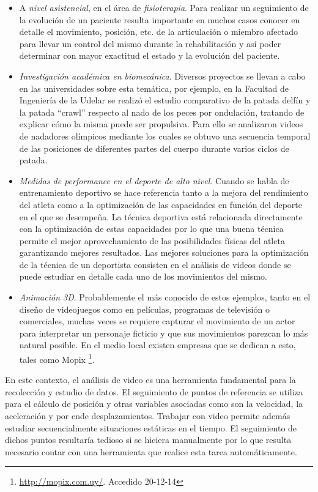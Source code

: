 \begin{itemize}
\item A \emph{nivel asistencial}, en el área de \emph{fisioterapia}. Para realizar un seguimiento de la evolución de un paciente resulta importante en muchos casos conocer en detalle el movimiento, posición, etc. de la articulación o miembro afectado para llevar un control del mismo durante la rehabilitación y así poder determinar con mayor exactitud el estado y la evolución del paciente.
\item \emph{Investigación académica en biomecánica}. Diversos proyectos se llevan a cabo en las universidades sobre esta temática, por ejemplo, en la Facultad de Ingeniería de la Udelar  se realizó el estudio comparativo de la patada delfín y la patada “crawl” respecto al nado de los peces por ondulación, tratando de explicar cómo la misma puede ser propulsiva. Para ello se analizaron videos de nadadores olímpicos mediante los cuales se obtuvo una secuencia temporal de las posiciones de diferentes partes del cuerpo durante varios ciclos de patada.
\item \emph{Medidas de performance en el deporte de alto nivel}. Cuando se habla de entrenamiento deportivo se hace referencia tanto a la mejora del rendimiento del atleta como a la optimización de las capacidades en función del deporte en el que se desempeña. La técnica deportiva está relacionada directamente con la optimización de estas capacidades por lo que una buena técnica permite el mejor aprovechamiento de las posibilidades físicas del atleta garantizando mejores resultados. Las mejores soluciones para la optimización de la técnica de un deportista consisten en el análisis de videos donde se puede estudiar en detalle cada uno de los movimientos del  mismo.
\item \emph{Animación 3D}. Probablemente el más conocido de estos ejemplos, tanto en el diseño de videojuegos como en películas, programas de televisión o comerciales, muchas veces se requiere capturar el movimiento de un actor para interpretar un personaje ficticio y que sus movimientos parezcan lo más natural posible. En el medio local existen empresas que se dedican a esto, tales como Mopix \footnote{\textcolor{blue}{\underline{\url{http://mopix.com.uy/}}}. Accedido 20-12-14}.
\end{itemize}

En este contexto, el análisis de video  es  una  herramienta  fundamental para la recolección y estudio de datos. El seguimiento de puntos de referencia se utiliza para el cálculo de posición y otras variables asociadas como son la velocidad, la aceleración y por ende desplazamientos. Trabajar con video permite además estudiar secuencialmente situaciones estáticas en el tiempo. El seguimiento de dichos puntos resultaría tedioso si se hiciera manualmente por lo que resulta necesario contar con una herramienta que realice esta tarea automáticamente.
\\ 

